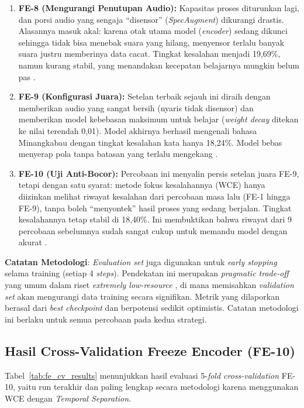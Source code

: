 \begin{enumerate}
    \item \textbf{FE-8 (Mengurangi Penutupan Audio):} Kapasitas proses diturunkan lagi, dan porsi audio yang sengaja ``disensor'' (\textit{SpecAugment}) dikurangi drastis. Alasannya masuk akal: karena otak utama model (\textit{encoder}) sedang dikunci sehingga tidak bisa menebak suara yang hilang, menyensor terlalu banyak suara justru memberinya data cacat. Tingkat kesalahan menjadi 19,69\%, namun kurang stabil, yang menandakan kecepatan belajarnya mungkin belum pas \cite{park2019specaugment}.

    \item \textbf{FE-9 (Konfigurasi Juara):} Setelan terbaik sejauh ini diraih dengan memberikan audio yang sangat bersih (nyaris tidak disensor) dan memberikan model kebebasan maksimum untuk belajar (\textit{weight decay} ditekan ke nilai terendah 0,01). Model akhirnya berhasil mengenali bahasa Minangkabau dengan tingkat kesalahan kata hanya 18,24\%. Model bebas menyerap pola tanpa batasan yang terlalu mengekang \cite{loshchilov2019adamw}.

    \item \textbf{FE-10 (Uji Anti-Bocor):} Percobaan ini menyalin persis setelan juara FE-9, tetapi dengan satu syarat: metode fokus kesalahannya (WCE) hanya diizinkan melihat riwayat kesalahan dari percobaan masa lalu (FE-1 hingga FE-9), tanpa boleh ``menyontek'' hasil proses yang sedang berjalan. Tingkat kesalahannya tetap stabil di 18,40\%. Ini membuktikan bahwa riwayat dari 9 percobaan sebelumnya sudah sangat cukup untuk memandu model dengan akurat \cite{pineiromartin2024weighted}.
\end{enumerate}

\textbf{Catatan Metodologi}: \textit{Evaluation set} juga digunakan untuk \textit{early stopping} selama training (setiap 4 \textit{steps}). Pendekatan ini merupakan \textit{pragmatic trade-off} yang umum dalam riset \textit{extremely low-resource} \cite{liang2025fieldmatters}, di mana memisahkan \textit{validation set} akan mengurangi data training secara signifikan. Metrik yang dilaporkan berasal dari \textit{best checkpoint} dan berpotensi sedikit optimistis. Catatan metodologi ini berlaku untuk semua percobaan pada kedua strategi.

\subsection{Hasil Cross-Validation Freeze Encoder (FE-10)}

Tabel~\ref{tab:fe_cv_results} menunjukkan hasil evaluasi 5-\textit{fold cross-validation} FE-10, yaitu run terakhir dan paling lengkap secara metodologi karena menggunakan WCE dengan \textit{Temporal Separation}.

